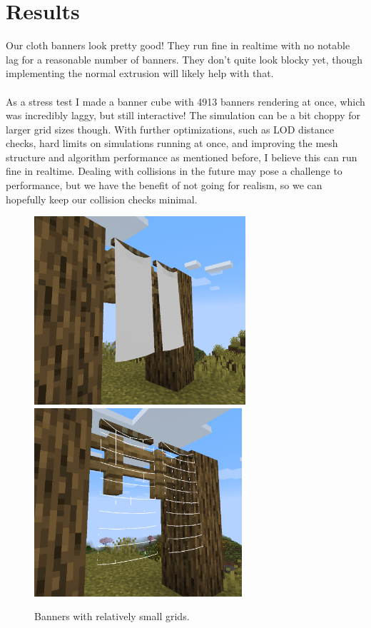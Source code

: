 \documentclass[12pt]{article}
\begin{document}
\section{Results}

Our cloth banners look pretty good! They run fine in realtime with no notable lag for a reasonable number of banners. They don't quite look blocky yet, though implementing the normal extrusion will likely help with that.\\
\\
As a stress test I made a banner cube with 4913 banners rendering at once, which was incredibly laggy, but still interactive! The simulation can be a bit choppy for larger grid sizes though. With further optimizations, such as LOD distance checks, hard limits on simulations running at once, and improving the mesh structure and algorithm performance as mentioned before, I believe this can run fine in realtime. Dealing with collisions in the future may pose a challenge to performance, but we have the benefit of not going for realism, so we can hopefully keep our collision checks minimal.
\begin{figure}[hp]
    \begin{center}
        \includegraphics[height=2.75in]{images/bannersflowy.png}
        \includegraphics[height=2.75in]{images/bannersflowywireframe.png}
    \end{center}
    \caption{Banners with relatively small grids.}
\end{figure}
\end{document}
